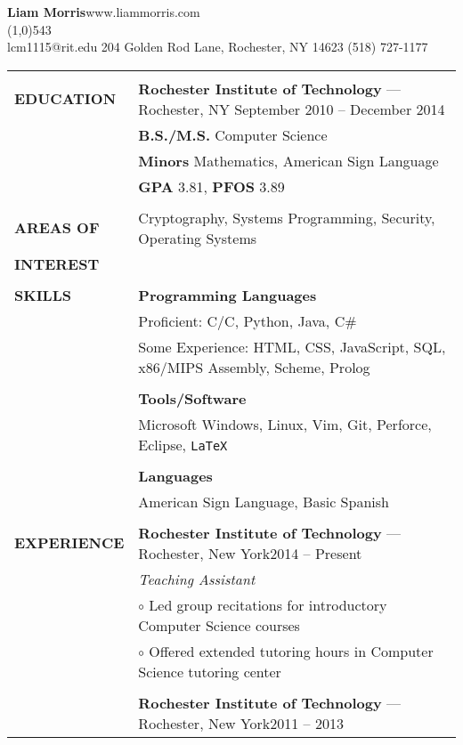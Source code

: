\documentclass[10pt,letterpaper]{article}
\newcommand{\CPP}{C\nolinebreak[4]\hspace{-.05em}\raisebox{.22ex}{\footnotesize\bf ++}}
\newcommand{\circbullet}{\hspace{10pt}$\circ$ }
\begin{document}
\raggedright

\textbf{\huge{Liam Morris}}\hfill www.liammorris.com\\
\vspace{-8pt}
\line(1,0){543}\\
lcm1115@rit.edu \hfill 204 Golden Rod Lane, Rochester, NY 14623 \hfill (518) 727-1177\\
\vspace{5pt}

\begin{tabular}{@{}lp{6.6in}}
&\\
\textbf{EDUCATION}
&\textbf{Rochester Institute of Technology} --- Rochester, NY \hfill September 2010 -- December 2014\\
&\textbf{B.S./M.S.} Computer Science\\
&\textbf{Minors} Mathematics, American Sign Language\\
&\textbf{GPA} 3.81, \textbf{PFOS} 3.89\\
&\\
\textbf{AREAS OF}
&Cryptography, Systems Programming, Security, Operating Systems\\
\textbf{INTEREST}&\\
&\\
\textbf{SKILLS}
&\textbf{Programming Languages}\\
&Proficient: C/\CPP, Python, Java, C\#\\
&Some Experience: HTML, CSS, JavaScript, SQL, x86/MIPS Assembly, Scheme, Prolog\\
&\\
&\textbf{Tools/Software}\\
&Microsoft Windows, Linux, Vim, Git, Perforce, Eclipse, \texttt{\LaTeX}\\
&\\
&\textbf{Languages}\\
&American Sign Language, Basic Spanish\\
&\\
\textbf{EXPERIENCE}
&\textbf{Rochester Institute of Technology} --- Rochester, New York\hfill 2014 -- Present\\
&\emph{Teaching Assistant}\\
&\circbullet Led group recitations for introductory Computer Science courses\\
&\circbullet Offered extended tutoring hours in Computer Science tutoring center\\
&\\
&\textbf{Rochester Institute of Technology} --- Rochester, New York\hfill 2011 -- 2013\\

\end{tabular}
\end{document}
